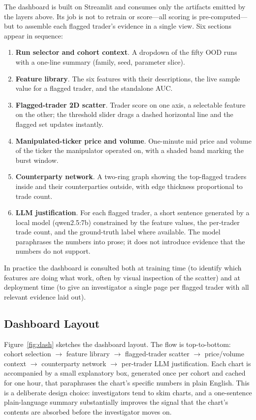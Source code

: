 \documentclass[10pt,twocolumn,letterpaper]{article}
\begin{document}
The dashboard is built on Streamlit and consumes only the artifacts
emitted by the layers above. Its job is not to retrain or score---all
scoring is pre-computed---but to assemble each flagged trader's
evidence in a single view. Six sections appear in sequence:

\begin{enumerate}
\item \textbf{Run selector and cohort context}. A dropdown of the
fifty OOD runs with a one-line summary (family, seed, parameter slice).
\item \textbf{Feature library}. The six features with their
descriptions, the live sample value for a flagged trader, and the
standalone AUC.
\item \textbf{Flagged-trader 2D scatter}. Trader score on one axis, a
selectable feature on the other; the threshold slider drags a dashed
horizontal line and the flagged set updates instantly.
\item \textbf{Manipulated-ticker price and volume}. One-minute mid
price and volume of the ticker the manipulator operated on, with a
shaded band marking the burst window.
\item \textbf{Counterparty network}. A two-ring graph showing the
top-flagged traders inside and their counterparties outside, with edge
thickness proportional to trade count.
\item \textbf{LLM justification}. For each flagged trader, a short
sentence generated by a local model (qwen2.5:7b) constrained by the
feature values, the per-trader trade count, and the ground-truth label
where available. The model paraphrases the numbers into prose; it does
not introduce evidence that the numbers do not support.
\end{enumerate}

In practice the dashboard is consulted both at training time (to
identify which features are doing what work, often by visual
inspection of the scatter) and at deployment time (to give an
investigator a single page per flagged trader with all relevant
evidence laid out).


\subsection{Dashboard Layout}
\label{sec:dashlayout}
Figure~\ref{fig:dash} sketches the dashboard layout. The flow is
top-to-bottom: cohort selection $\rightarrow$ feature library
$\rightarrow$ flagged-trader scatter $\rightarrow$ price/volume context
$\rightarrow$ counterparty network $\rightarrow$ per-trader LLM
justification. Each chart is accompanied by a small explanatory box,
generated once per cohort and cached for one hour, that paraphrases
the chart's specific numbers in plain English. This is a deliberate
design choice: investigators tend to skim charts, and a one-sentence
plain-language summary substantially improves the signal that the
chart's contents are absorbed before the investigator moves on.
\end{document}
